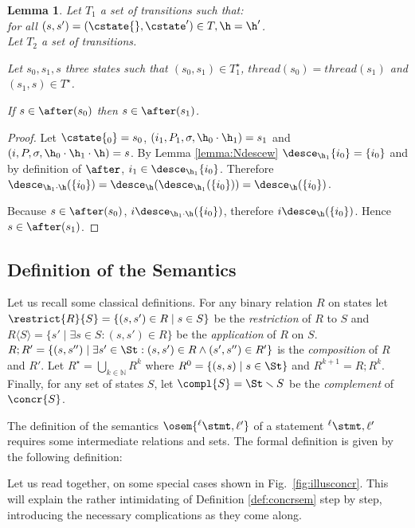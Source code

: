 \documentclass[12pt]{article}
\newcommand{\lab}{  {}^{\ell}}
\newcommand{\thread}{\mathit{thread}}
\newtheorem{lemma}{Lemma}
\begin{document}
\begin{lemma}\label{lemma:H}
Let \(T_1\) a set of transitions such that:\\ for all \((s,s')=(\cstate{},\cstate')\in T, \h=\h'\).\\
Let \(T_2\) a set of transitions.

Let \(s_0,s_1,s\) three states such that  \((s_0,s_1)\in T_1^{\star}\), \(\thread(s_0)=\thread(s_1)\) and \((s_1,s)\in T^{\star}\).

If \(s\in\after(s_0)\) then \(s\in\after(s_1)\).
\end{lemma}
\begin{proof}
 Let \(\cstate{_0} =s_0 \), \((i_1,P_1,\m,\h_0\cdot\h_1)=s_1\) and \((i,P,\m,\h_0\cdot\h_1\cdot\h)=s\).
 By Lemma \ref{lemma:Ndescew} \(\desce_{\h_1}\{i_0\}=\{i_0\}\) and by definition of \(\after\), \(i_1\in \desce_{\h_1}\{i_0\}\).
 Therefore \(\desce_{\h_1\cdot\h}(\{i_0\}) = \desce_{\h}(\desce_{\h_1}(\{i_0\})) = \desce_{\h}(\{i_0\})\).
 
 Because \(s\in\after(s_0)\), \(i\desce_{\h_1\cdot\h}(\{i_0\})\), therefore \(i\desce_{\h}(\{i_0\})\). Hence \(s\in\after(s_1)\).
\end{proof}

\subsection{Definition of the \Cname Semantics}

 \mondessinlocdef

Let us recall some classical definitions.
For any binary relation \(R\) on states let \(\restrict{R}{S}=\{(s,s')\in R \mid s\in S\}\) be the \emph{restriction} of \(R\) to \(S\) and \(R\langle S \rangle=\{s'\mid\exists s\in S : (s,s')\in R\}\) be the \emph{application} of \(R\) on \(S\). \(R ; R' =\{(s,s'') \mid\exists s'\in\St : (s,s')\in R \wedge (s',s'')\in R' \}\) is the \emph{composition} of \(R\) and \(R'\). Let \(R^{\star} = \bigcup_{k\in\mathbb{N}}R^{k}\) where \(R^{0}=\{(s,s) \mid s\in\St\}\) and \(R^{k+1}=R; R^{k}\). Finally, for any set of states \(S\), let \(\compl{S}=\St\smallsetminus S\) be the \emph{complement} of \(\concr{S}\).


The definition of the \cname semantics \(\osem{\lab \stmt,\ell'}\) of a statement \(\lab \stmt,\ell'\) requires some intermediate relations and sets. The formal definition is given by the following definition:
 
 \formaldefsem
 
 Let us read together, on some special cases shown in Fig.~\ref{fig:illusconcr}. This will explain the rather intimidating of Definition \ref{def:concrsem} step by step, introducing the necessary complications as they come along.
\end{document}
